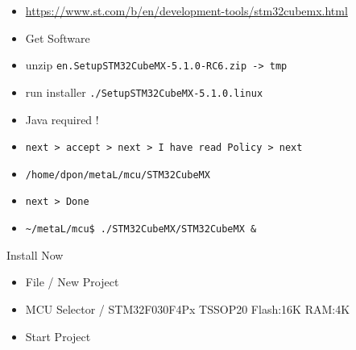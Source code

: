 
\begin{itemize}
  \item 
\url{https://www.st.com/b/en/development-tools/stm32cubemx.html}
  \item
Get Software
\item
unzip \verb|en.SetupSTM32CubeMX-5.1.0-RC6.zip -> tmp|
\item
run installer \verb|./SetupSTM32CubeMX-5.1.0.linux|
\item 
Java required !
\item
\verb|next > accept > next > I have read Policy > next|
\item 
\verb|/home/dpon/metaL/mcu/STM32CubeMX|
\item 
\verb|next > Done|
\item 
\verb|~/metaL/mcu$ ./STM32CubeMX/STM32CubeMX &|
\end{itemize}



 Install Now

\begin{itemize}
  \item File / New Project
  \item MCU Selector / STM32F030F4Px TSSOP20 Flash:16K RAM:4K
  \item Start Project
\end{itemize}


\secup